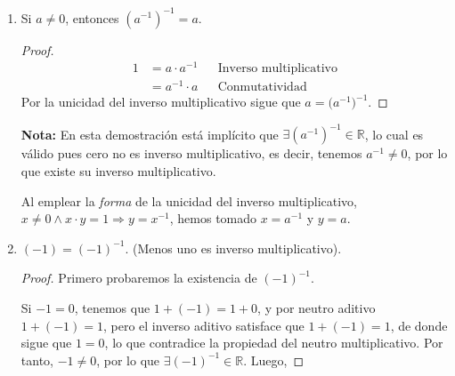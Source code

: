 \documentclass[11pt]{article}
\newcommand{\R}{\mathbb{R}}
\begin{document}
\begin{enumerate}[label=\alph*)]
\pagebreak

    \item Si $a\neq 0$, entonces $\left( a^{-1} \right)^{-1}=a$.
    \vspace{-1em}
    \begin{proof} 
        \begin{align*}
            1 &= a\cdot a^{-1} && \text{Inverso multiplicativo}\\
            &= a^{-1} \cdot a && \text{Conmutatividad}
        \end{align*} Por la unicidad del inverso multiplicativo sigue que $a=\bigl(a^{-1}\bigr)^{-1}$.
    \end{proof} \vspace{-1em}
    \textbf{Nota:} En esta demostración está implícito que $\exists\left( a^{-1} \right)^{-1}\in \R$, lo cual es válido pues cero no es inverso multiplicativo, es decir, tenemos $a^{-1}\neq 0$, por lo que existe su inverso multiplicativo.
    
    Al emplear la \textit{forma} de la unicidad del inverso multiplicativo, $x\neq 0 \land x\cdot y=1 \Longrightarrow y = x^{-1}$, hemos tomado $x=a^{-1}$ y $y=a$.

    \item $(-1)=(-1)^{-1}$. (Menos uno es inverso multiplicativo).
    
    \vspace{-1em}\begin{proof} Primero probaremos la existencia de $(-1)^{-1}$.
        
    Si $-1=0$, tenemos que $1+(-1)=1+0$, y por neutro aditivo $1+(-1)=1$, pero el inverso aditivo satisface que $1+(-1)=1$, de donde sigue que $1=0$, lo que contradice la propiedad del neutro multiplicativo. Por tanto, $-1\neq 0$, por lo que $\exists (-1)^{-1}\in \R$. Luego,


\end{proof}
\end{enumerate}
\end{document}
